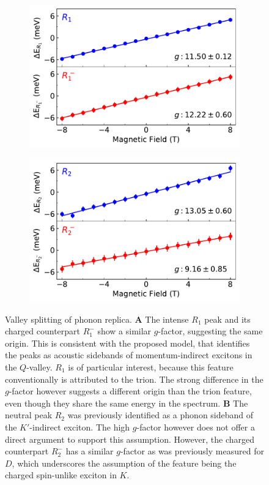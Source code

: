 \begin{figure}[t]
	\begin{subfigure}{0.49\textwidth}
		\caption{}
		\includegraphics[width=\textwidth]{G_R1}
	\end{subfigure}
	\begin{subfigure}{0.49\textwidth}
		\caption{}
		\includegraphics[width=\textwidth]{G_R2}
	\end{subfigure}
	\caption{Valley splitting of phonon replica. \textbf{A} The intense $R_1$ peak and its charged counterpart $R^-_1$ show a similar $g$-factor, suggesting the same origin. This is consistent with the proposed model, that identifies the peaks as acoustic sidebands of momentum-indirect excitons in the $Q$-valley. $R_1$ is of particular interest, because this feature conventionally is attributed to the trion. The strong difference in the $g$-factor however suggests a different origin than the trion feature, even though they share the same energy in the spectrum. \textbf{B} The neutral peak $R_2$ was previously identified as a phonon sideband of the $K'$-indirect exciton. The high $g$-factor however does not offer a direct argument to support this assumption. However, the charged counterpart $R^-_2$ has a similar $g$-factor as was previously measured for $D$, which underscores the assumption of the feature being the charged spin-unlike exciton in $K$. } 
	\label{Rfits}
\end{figure}

